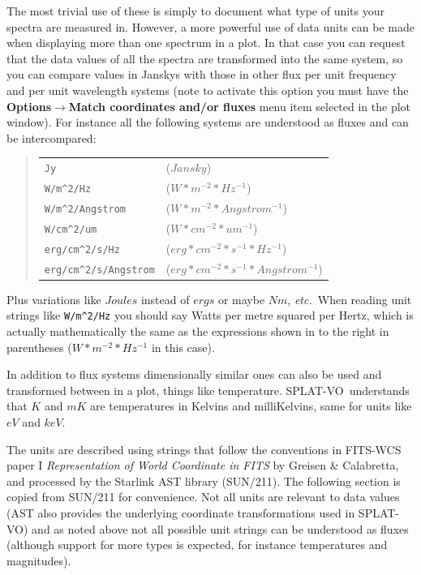 \documentclass[twoside,11pt]{article}
\newcommand{\latexhtml}[2]{#1}
\newcommand{\xref}[3]{#1}
\renewcommand{\_}{\texttt{\symbol{95}}}
\newcommand{\SPLAT}{\textsf{SPLAT-VO}}
\newcommand{\submenuitem}[2]{\latexhtml{\textbf{#1$\rightarrow$#2}}{\textbf{#1->#2}}}
\newcommand{\hitext}[1]{\texttt{#1}}
\newcommand{\etc}{\textit{etc.}}
\begin{document}
The most trivial use of these is simply to document what type of units your
spectra are measured in. However, a more powerful use of data units can be
made when displaying more than one spectrum in a plot.  In that case you can
request that the data values of all the spectra are transformed into the same
system, so you can compare values in Janskys with those in other flux per unit
frequency and per unit wavelength systems (note to activate this option you
must have the
\submenuitem{Options}{Match coordinates and/or fluxes} menu item selected
in the plot window). For instance all the following systems are understood as
fluxes and can be intercompared:
\begin{quote}
\begin{tabular}{ll}
\verb+Jy+                  & ($Jansky$)                                \\
\verb+W/m^2/Hz+            & ($W*m^{-2}*Hz^{-1}$)                      \\
\verb+W/m^2/Angstrom+      & ($W*m^{-2}*Angstrom^{-1}$)                \\
\verb+W/cm^2/um+           & ($W*cm^{-2}*um^{-1}$)                     \\
\verb+erg/cm^2/s/Hz+       & ($erg*cm^{-2}*s^{-1}*Hz^{-1}$)            \\
\verb+erg/cm^2/s/Angstrom+ & ($erg*cm^{-2}*s^{-1}*Angstrom^{-1}$)
\end{tabular}
\end{quote}
Plus variations like $Joules$ instead of $ergs$ or maybe $N m$, \etc\
When reading unit strings like \verb+W/m^2/Hz+ you should say Watts per metre
squared per Hertz, which is actually mathematically the same as the
expressions shown in to the right in parentheses
(\hitext{$W*m^{-2}*Hz^{-1}$} in this case).

In addition to flux systems dimensionally similar ones can also be used and
transformed between in a plot, things like temperature. \SPLAT\ understands
that $K$ and $mK$ are temperatures in Kelvins and milliKelvins, same for units
like $eV$ and $keV$.

The units are described using strings that follow the conventions in FITS-WCS
paper I \textit{Representation of World Coordinate in FITS} by Greisen \&
Calabretta, and processed by the Starlink AST library
(\xref{SUN/211}{sun211}{}).
The following section is copied from SUN/211 for convenience. Not all units
are relevant to data values (AST also provides the underlying coordinate
transformations used in \SPLAT) and as noted above not all possible unit
strings can be understood as fluxes (although support for more types is
expected, for instance temperatures and magnitudes).
\end{document}
